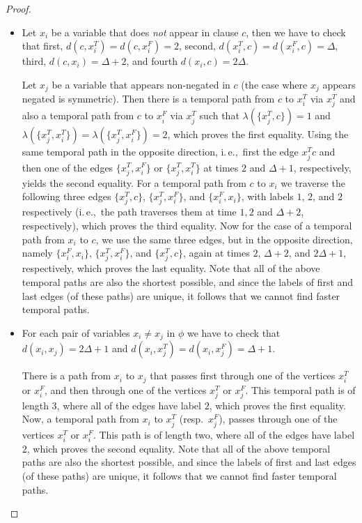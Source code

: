 \documentclass[a4paper,UKenglish,cleveref, autoref, thm-restate, anonymous]{lipics-v2021}
\newcommand{\ie}{i.\,e.,\ }
\begin{document}
\begin{proof}
\begin{itemize}
    \item Let $x_i$ be a variable that does \emph{not} appear in clause $c$, then we have to check that
    first,
    $d(c,x_i^T)=d(c,x_i^F)=2$,
    second, $d(x_i^T, c) = d(x_i^F,c)=\Delta$,
    third, $d(c,x_i)=\Delta + 2$,
    and fourth $d(x_i,c)=2 \Delta$.

    Let $x_j$ be a variable that appears non-negated in $c$ (the case where $x_j$ appears negated is symmetric). 
    Then there is a temporal path 
    from $c$ to $x_i^T$ via $x_j^T$ and also a temporal path 
    from $c$ to $x_i^F$ via $x_j^T$ such that $\lambda(\{x_j^T, c\})=1$ and $\lambda(\{x_j^T, x_i^T\})=\lambda(\{x_j^T, x_i^F\})=2$,
    which proves the first equality.
    Using the same temporal path in the opposite direction,
    \ie first the edge $x_j^T c$ and then one of the edges $\{x_j^T, x_i^F\}$ or $\{x_j^T, x_i^T\}$ at times $2$ and $\Delta + 1$, respectively,
    yields the second equality.
    For a temporal path from $c$ to $x_i$ we traverse the following three edges 
    $\{x_j^T, c\}$, $\{x_j^T, x_i^F\}$, and $\{x_i^F,x_i\}$,
    with labels $1$, $2$, and $2$ respectively (\ie the path traverses them at time $1,2$ and $\Delta + 2$, respectively), which proves the third equality.
    Now for the case of a temporal path from $x_i$ to $c$,
    we use the same three edges, but in the opposite direction,
    namely $\{x_i^F,x_i\}$, $\{x_j^T, x_i^F\}$, and $\{x_j^T, c\}$,
    again at times $2$, $\Delta + 2$, and $2\Delta + 1$, respectively,
    which proves the last equality.
    Note that all of the above temporal paths are also the shortest possible, 
    and since the labels of first and last edges (of these paths) are unique,
    it follows that we cannot find faster temporal paths.
    
    \item For each pair of variables $x_i \neq x_j$ in $\phi$ we have to check that
    $d(x_i,x_j)=2\Delta +1$ and
    $d(x_i,x_j^T)=d(x_i,x_j^F)=\Delta + 1$.

    There is a path from $x_i$ to $x_j$ that passes first through one of the vertices 
    $x_i^T$ or $x_i^F$, 
    and then through one of the vertices $x_j^T$ or $x_j^F$.
    This temporal path is of length $3$, where all of the edges have label $2$,
    which proves the first equality.
    Now, a temporal path from $x_i$ to $x_j^T$ (resp.~$x_j^F$),
    passes through one of the vertices $x_i^T$ or $x_i^F$.
    This path is of length two, where all of the edges have label $2$,
    which proves the second equality.
    Note that all of the above temporal paths are also the shortest possible, 
    and since the labels of first and last edges (of these paths) are unique,
    it follows that we cannot find faster temporal paths.
    

\end{itemize}
\end{proof}
\end{document}

